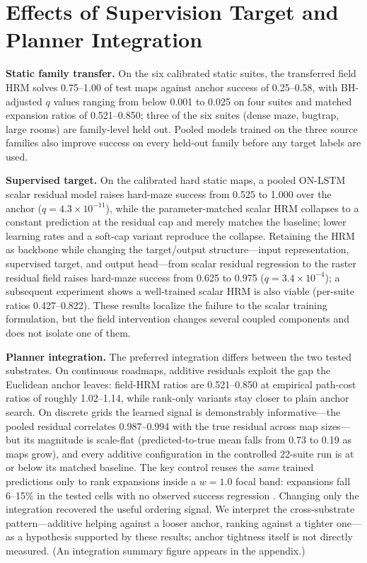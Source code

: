 \documentclass[letterpaper]{article} %
\begin{document}
\section{Effects of Supervision Target and Planner Integration}

\textbf{Static family transfer.} On the six calibrated static suites, the transferred field HRM solves 0.75--1.00 of test maps against anchor success of 0.25--0.58, with BH-adjusted $q$ values ranging from below 0.001 to 0.025 on four suites and matched expansion ratios of 0.521--0.850; three of the six suites (dense maze, bugtrap, large rooms) are family-level held out. Pooled models trained on the three source families also improve success on every held-out family before any target labels are used.

\textbf{Supervised target.} On the calibrated hard static maps, a pooled ON-LSTM scalar residual model raises hard-maze success from 0.525 to 1.000 over the anchor ($q=4.3\times10^{-11}$), while the parameter-matched scalar HRM collapses to a constant prediction at the residual cap and merely matches the baseline; lower learning rates and a soft-cap variant reproduce the collapse. Retaining the HRM as backbone while changing the target/output structure---input representation, supervised target, and output head---from scalar residual regression to the raster residual field raises hard-maze success from 0.625 to 0.975 ($q=3.4\times10^{-4}$); a subsequent experiment shows a well-trained scalar HRM is also viable (per-suite ratios 0.427--0.822). These results localize the failure to the scalar training formulation, but the field intervention changes several coupled components and does not isolate one of them.

\textbf{Planner integration.} The preferred integration differs between the two tested substrates. On continuous roadmaps, additive residuals exploit the gap the Euclidean anchor leaves: field-HRM ratios are 0.521--0.850 at empirical path-cost ratios of roughly 1.02--1.14, while rank-only variants stay closer to plain anchor search. On discrete grids the learned signal is demonstrably informative---the pooled residual correlates 0.987--0.994 with the true residual across map sizes---but its magnitude is scale-flat (predicted-to-true mean falls from 0.73 to 0.19 as maps grow), and every additive configuration in the controlled 22-suite run is at or below its matched baseline. The key control reuses the \emph{same} trained predictions only to rank expansions inside a $w{=}1.0$ focal band: expansions fall 6--15\% in the tested cells with no observed success regression \citep{chrestien2023rank}. Changing only the integration recovered the useful ordering signal. We interpret the cross-substrate pattern---additive helping against a looser anchor, ranking against a tighter one---as a hypothesis supported by these results; anchor tightness itself is not directly measured. (An integration summary figure appears in the appendix.)
\end{document}
